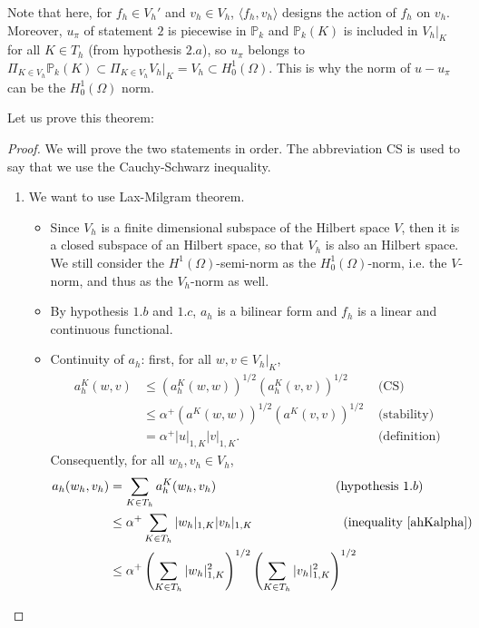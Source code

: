 \begin{remark}
Note that here, for $f_h\in V_h'$ and $v_h \in V_h$, $\langle f_h,v_h\rangle$ designs the action of $f_h$ on $v_h$. Moreover, $u_\pi$ of statement $2$ is piecewise in $\mathbb{P}_k$ and $\mathbb{P}_k(K)$ is included in $V_h|_K$ for all $K\in T_h$ (from hypothesis $2.a$), so $u_\pi$ belongs to $\Pi_{K\in V_h} \mathbb{P}_k(K) \subset \Pi_{K\in V_h} V_h|_K = V_h \subset H_0^1(\Omega)$. This is why the norm of $u-u_\pi$ can be the $H_0^1(\Omega)$ norm. 
\end{remark}

\noindent Let us prove this theorem:
\begin{proof}
We will prove the two statements in order. The abbreviation CS is used to say that we use the Cauchy-Schwarz inequality.
\begin{enumerate}
\item We want to use Lax-Milgram theorem. 
\begin{itemize}
\item Since $V_h$ is a finite dimensional subspace of the Hilbert space $V$, then it is a closed subspace of an Hilbert space, so that $V_h$ is also an Hilbert space. We still consider the $H^1(\Omega)$-semi-norm as the $H_0^1(\Omega)$-norm, i.e. the $V$-norm, and thus as the $V_h$-norm as well.
\item By hypothesis $1.b$ and $1.c$, $a_h$ is a bilinear form and $f_h$ is a linear and continuous functional.
\item Continuity of $a_h$: first, for all $w,v\in V_h|_K$, 
\begin{align}
a_h^K(w,v) &\leq \left( a_h^K\left( w,w \right)\right)^{1/2}\left( a_h^K\left (v,v \right)\right)^{1/2} &\text{ (CS)} \nonumber \\
&\leq \alpha^+\left( a^K\left( w,w \right)\right)^{1/2}\left( a^K\left (v,v \right)\right)^{1/2} &\text{ (stability)} \nonumber \\
&= \alpha^+|u|_{1,K}|v|_{1,K}. &\text{ (definition)} \label{ahKalpha}
\end{align}
Consequently, for all $w_h, v_h \in V_h$, 
\begin{align*}
a_h(w_h,v_h) &= \sum_{K\in T_h} a_h^K(w_h,v_h) \hspace{3.2cm} \text{ (hypothesis }1.b)\\
&\leq \alpha^+\sum_{K\in T_h} |w_h|_{1,K}|v_h|_{1,K} \hspace{2.4cm}\text{ (inequality \ref{ahKalpha})}\\
&\leq \alpha^+\left( \sum_{K\in T_h}|w_h|_{1,K}^2 \right)^{1/2}\left( \sum_{K\in T_h}|v_h|_{1,K}^2 \right)^{1/2} \\

\end{align*}
\end{itemize}
\end{enumerate}
\end{proof}
